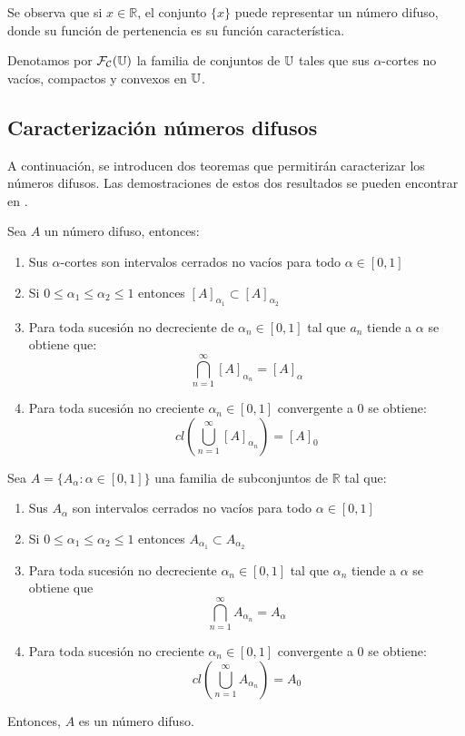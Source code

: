   Se observa que si $x \in \mathbb{R}$, el conjunto $\{x\}$ puede representar un número difuso, donde su función de pertenencia es su función característica.

  Denotamos por $\mathcal{F}_\mathcal{C}(\mathbb U)$ la familia de conjuntos de $\mathbb U$ tales que sus $\alpha$-cortes no vacíos, compactos y convexos en $\mathbb U$.
  \subsection{Caracterización números difusos}
  A continuación, se introducen dos teoremas que permitirán caracterizar los números difusos. Las demostraciones de estos dos resultados se pueden encontrar en \cite{fuzzyintro}.

  \begin{teorema}
    Sea $A$ un número difuso, entonces:
    \begin{enumerate}
    \item Sus $\alpha$-cortes son intervalos cerrados no vacíos para todo $\alpha \in [0, 1]$
    \item Si $0 \leq \alpha_1 \leq \alpha_2 \leq 1$ entonces $[A]_{\alpha_1} \subset [A]_{\alpha_2}$
    \item Para toda sucesión no decreciente de $\alpha_n \in [0, 1]$ tal que $a_n$ tiende a $\alpha$ se obtiene que:
      \[
      \bigcap^\infty_{n=1} [A]_{\alpha_n} = [A]_\alpha
      \]
    \item Para toda sucesión no creciente $\alpha_n \in [0, 1]$ convergente a $0$ se obtiene:
      \[
      cl\left(
      \bigcup^\infty_{n=1} [A]_{\alpha_n} \right) = [A]_0
      \]
    \end{enumerate}
  \end{teorema}

  \begin{teorema}
    Sea $A=\{A_\alpha : \alpha \in [0, 1]\}$ una familia de subconjuntos de $\mathbb{R}$ tal que:
    
    \begin{enumerate}
    \item Sus $A_\alpha$ son intervalos cerrados no vacíos para todo $\alpha \in [0, 1]$
    \item Si $0 \leq \alpha_1 \leq \alpha_2 \leq 1$ entonces $A_{\alpha_1} \subset A_{\alpha_2}$
    \item Para toda sucesión no decreciente $\alpha_n \in [0, 1]$ tal que $\alpha_n$ tiende a $\alpha$ se obtiene que
      $$
      \bigcap^\infty_{n=1} A_{\alpha_n}=A_\alpha
      $$
    \item Para toda sucesión no creciente $\alpha_n \in [0, 1]$ convergente a $0$ se obtiene:
      $$
      cl\left(\bigcup^\infty_{n=1} A_{\alpha_n}\right)=A_0
      $$
    \end{enumerate}
    Entonces, $A$ es un número difuso.
  \end{teorema}


